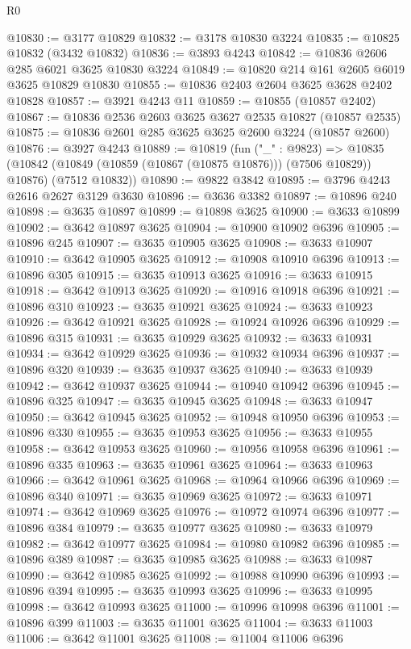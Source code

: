 \begin{lexlean}{R0}
\begin{coremodule}
@10830 := @3177 @10829
@10832 := @3178 @10830 @3224
@10835 := @10825 @10832 (@3432 @10832)
@10836 := @3893 @4243
@10842 := @10836 @2606 @285 @6021 @3625 @10830 @3224
@10849 := @10820 @214 @161 @2605 @6019 @3625 @10829 @10830
@10855 := @10836 @2403 @2604 @3625 @3628 @2402 @10828
@10857 := @3921 @4243 @11
@10859 := @10855 (@10857 @2402)
@10867 := @10836 @2536 @2603 @3625 @3627 @2535 @10827 (@10857 @2535)
@10875 := @10836 @2601 @285 @3625 @3625 @2600 @3224 (@10857 @2600)
@10876 := @3927 @4243
@10889 := @10819
    (fun ("_" : @9823) =>
    @10835 (@10842 (@10849 (@10859 (@10867 (@10875 @10876))) (@7506 @10829)) @10876) (@7512 @10832))
@10890 := @9822 @3842
@10895 := @3796 @4243 @2616 @2627 @3129 @3630
@10896 := @3636 @3382
@10897 := @10896 @240
@10898 := @3635 @10897
@10899 := @10898 @3625
@10900 := @3633 @10899
@10902 := @3642 @10897 @3625
@10904 := @10900 @10902 @6396
@10905 := @10896 @245
@10907 := @3635 @10905 @3625
@10908 := @3633 @10907
@10910 := @3642 @10905 @3625
@10912 := @10908 @10910 @6396
@10913 := @10896 @305
@10915 := @3635 @10913 @3625
@10916 := @3633 @10915
@10918 := @3642 @10913 @3625
@10920 := @10916 @10918 @6396
@10921 := @10896 @310
@10923 := @3635 @10921 @3625
@10924 := @3633 @10923
@10926 := @3642 @10921 @3625
@10928 := @10924 @10926 @6396
@10929 := @10896 @315
@10931 := @3635 @10929 @3625
@10932 := @3633 @10931
@10934 := @3642 @10929 @3625
@10936 := @10932 @10934 @6396
@10937 := @10896 @320
@10939 := @3635 @10937 @3625
@10940 := @3633 @10939
@10942 := @3642 @10937 @3625
@10944 := @10940 @10942 @6396
@10945 := @10896 @325
@10947 := @3635 @10945 @3625
@10948 := @3633 @10947
@10950 := @3642 @10945 @3625
@10952 := @10948 @10950 @6396
@10953 := @10896 @330
@10955 := @3635 @10953 @3625
@10956 := @3633 @10955
@10958 := @3642 @10953 @3625
@10960 := @10956 @10958 @6396
@10961 := @10896 @335
@10963 := @3635 @10961 @3625
@10964 := @3633 @10963
@10966 := @3642 @10961 @3625
@10968 := @10964 @10966 @6396
@10969 := @10896 @340
@10971 := @3635 @10969 @3625
@10972 := @3633 @10971
@10974 := @3642 @10969 @3625
@10976 := @10972 @10974 @6396
@10977 := @10896 @384
@10979 := @3635 @10977 @3625
@10980 := @3633 @10979
@10982 := @3642 @10977 @3625
@10984 := @10980 @10982 @6396
@10985 := @10896 @389
@10987 := @3635 @10985 @3625
@10988 := @3633 @10987
@10990 := @3642 @10985 @3625
@10992 := @10988 @10990 @6396
@10993 := @10896 @394
@10995 := @3635 @10993 @3625
@10996 := @3633 @10995
@10998 := @3642 @10993 @3625
@11000 := @10996 @10998 @6396
@11001 := @10896 @399
@11003 := @3635 @11001 @3625
@11004 := @3633 @11003
@11006 := @3642 @11001 @3625
@11008 := @11004 @11006 @6396

\end{coremodule}
\end{lexlean}
